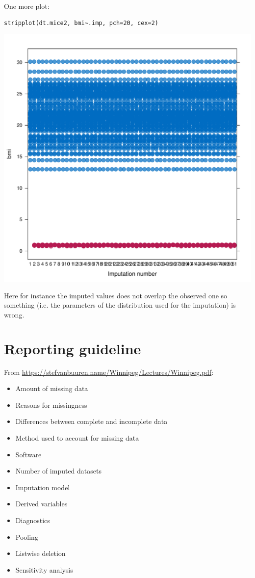 \documentclass[12pt]{article}
\begin{document}
One more plot:
\lstset{language=r,label= ,caption= ,captionpos=b,numbers=none}
\begin{lstlisting}
stripplot(dt.mice2, bmi~.imp, pch=20, cex=2)
\end{lstlisting}

\begin{center}
\includegraphics[width=.9\linewidth]{./striplotImputed2.pdf}
\end{center}

Here for instance the imputed values does not overlap the observed one
so something (i.e. the parameters of the distribution used for the
imputation) is wrong.

\section{Reporting guideline}
\label{sec:orgfddd78d}
From \url{https://stefvanbuuren.name/Winnipeg/Lectures/Winnipeg.pdf}:
\begin{itemize}
\item Amount of missing data
\item Reasons for missingness
\item Differences between complete and incomplete data
\item Method used to account for missing data
\item Software
\item Number of imputed datasets
\item Imputation model
\item Derived variables
\item Diagnostics
\item Pooling
\item Listwise deletion
\item Sensitivity analysis
\end{itemize}
\end{document}
